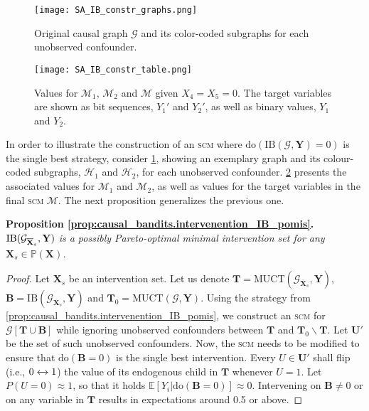 \begin{figure}[t]
    \centering
    \texttt{[image: SA\_IB\_constr\_graphs.png]}
    \caption{Original causal graph $\mathcal{G}$ and its color-coded subgraphs for each unobserved confounder.}
    \label{fig:causal_bandits.IB}
\end{figure}
\begin{figure}[t]
    \centering
    \texttt{[image: SA\_IB\_constr\_table.png]}
    \caption{Values for $\mathcal{M}_1$, $\mathcal{M}_2$ and $\mathcal{M}$ given $X_4= X_5=0$. The target variables are shown as bit sequences, $Y_1'$ and $Y_2'$, as well as binary values, $Y_1$ and $Y_2$.}
    \label{tab:causal_bandits_IB}
\end{figure} 

In order to illustrate the construction of an \textsc{scm} where $\text{do}(\text{IB}(\mathcal{G}, \mathbf{Y}) = 0)$ is the single best strategy, consider \cref{fig:causal_bandits.IB}, showing an exemplary graph and its colour-coded subgraphs, $\mathcal{H}_1$ and $\mathcal{H}_2$, for each unobserved confounder. \cref{tab:causal_bandits_IB} presents the associated values for $\mathcal{M}_1$ and $\mathcal{M}_2$, as well as values for the target variables in the final \textsc{scm} $\mathcal{M}$. The next proposition generalizes the previous one.


\textbf{Proposition \ref{prop:causal_bandits.intervenention_IB_pomis}.}
\textit{$\textnormal{IB}(\mathcal{G}_{\overline{\mathbf{X}}_s}, \mathbf{Y})$ is a possibly Pareto-optimal minimal intervention set for any $\mathbf{X}_s \in \mathbb{P}(\mathbf{X})$.}


\begin{proof}
  Let $\mathbf{X}_s$ be an intervention set. Let us denote $\mathbf{T} = \text{MUCT}(\mathcal{G}_{\overline{\mathbf{X}}_s},\mathbf{Y})$, $\mathbf{B} = \text{IB}(\mathcal{G}_{\overline{\mathbf{X}}_s},\mathbf{Y})$ and $\mathbf{T}_0 = \text{MUCT}(\mathcal{G},\mathbf{Y})$. Using the strategy from \autoref{prop:causal_bandits.intervenention_IB_pomis}, we construct an \textsc{scm} for $\mathcal{G}[\mathbf{T} \cup \mathbf{B}]$ while ignoring unobserved confounders between $\mathbf{T}$ and $\mathbf{T}_0 \backslash \mathbf{T}$. Let $\mathbf{U}'$ be the set of such unobserved confounders. Now, the \textsc{scm} needs to be modified to ensure that $\text{do}(\mathbf{B}=0)$ is the single best intervention. Every $U \in \mathbf{U}'$ shall flip (i.e., $0 \xleftrightarrow{} 1$) the value of its endogenous child in $\mathbf{T}$ whenever $U=1$. Let $P(U=0) \approx 1$, so that it holds $\mathbb{E}[Y_i | \text{do}(\mathbf{B}=0)] \approx 0$. Intervening on $\mathbf{B} \neq 0$ or on any variable in $\mathbf{T}$ results in expectations around 0.5 or above.
\end{proof}



